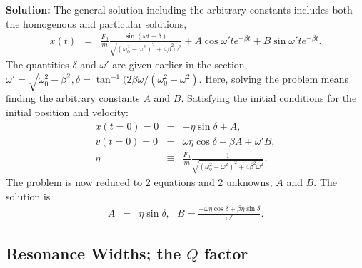 {\bf Solution:}
The general solution including the arbitrary constants includes both the homogenous and particular solutions,
\begin{eqnarray*}
x(t)&=&\frac{F_0}{m}\frac{\sin(\omega t-\delta)}{\sqrt{(\omega_0^2-\omega^2)^2+4\beta^2\omega^2}}
+A\cos\omega't e^{-\beta t}+B\sin\omega't e^{-\beta t}.
\end{eqnarray*}
The quantities $\delta$ and $\omega'$ are given earlier in the section, $\omega'=\sqrt{\omega_0^2-\beta^2}, \delta=\tan^{-1}(2\beta\omega/(\omega_0^2-\omega^2)$. Here, solving the problem means finding the arbitrary constants $A$ and $B$. Satisfying the initial conditions for the initial position and velocity:
\begin{eqnarray*}
x(t=0)=0&=&-\eta\sin\delta+A,\\
v(t=0)=0&=&\omega\eta\cos\delta-\beta A+\omega'B,\\
\eta&\equiv&\frac{F_0}{m}\frac{1}{\sqrt{(\omega_0^2-\omega^2)^2+4\beta^2\omega^2}}.
\end{eqnarray*}
The problem is now reduced to 2 equations and 2 unknowns, $A$ and $B$. The solution is
\begin{eqnarray}
A&=& \eta\sin\delta ,~~~B=\frac{-\omega\eta\cos\delta+\beta\eta\sin\delta}{\omega'}.
\end{eqnarray}

\exampleend

\subsection{Resonance Widths; the $Q$ factor}

